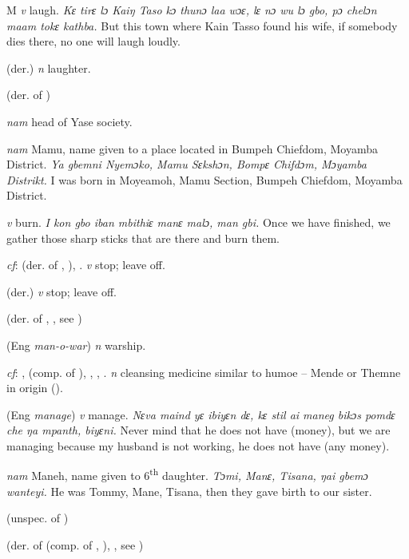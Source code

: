 \begin{letter}{M}
 \textit{v} laugh. \textit{Kɛ tirɛ lɔ Kaiŋ Taso kɔ thunɔ laa wɔɛ, lɛ nɔ wu lɔ gbo, pɔ chelɔn maam tokɛ kathba.} But this town where Kain Tasso found his wife, if somebody dies there, no one will laugh loudly.

 (der.) \textit{n} laughter.

 (der. of )

 \textit{nam} head of Yase society.

 \textit{nam} Mamu, name given to a place located in Bumpeh Chiefdom, Moyamba District. \textit{Ya gbemni Nyemɔko, Mamu Sɛkshɔn, Bompɛ Chifdɔm, Mɔyamba Distrikt.} I was born in Moyeamoh, Mamu Section, Bumpeh Chiefdom, Moyamba District.

 \textit{v} burn. \textit{I kon gbo iban mbithiɛ manɛ malɔ, man gbi.} Once we have finished, we gather those sharp sticks that are there and burn them.

 \textit{cf}:  (der. of , ), . \textit{v} stop; leave off.

 (der.) \textit{v} stop; leave off.

 (der. of , , see ) 

 (Eng \textit{man-o-war}) \textit{n} warship.

 \textit{cf}: ,  (comp. of ), , , . \textit{n} cleansing medicine similar to humoe – Mende or Themne in origin (\citealt{Hall1938}). 

 (Eng \textit{manage}) \textit{v} manage. \textit{Nɛva maind yɛ ibiyɛn dɛ, kɛ stil ai maneg bikɔs pomdɛ che ŋa mpanth, biyɛni.} Never mind that he does not have (money), but we are managing because my husband is not working, he does not have (any money). 

 \textit{nam} Maneh, name given to 6\textsuperscript{th} daughter. \textit{Tɔmi, Manɛ, Tisana, ŋai gbemɔ wanteyi.} He was Tommy, Mane, Tisana, then they gave birth to our sister.

 (unspec. of ) 

 (der. of  (comp. of , ), , see ) 


\end{letter}
